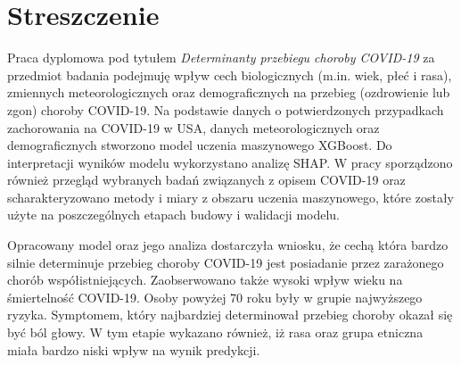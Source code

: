 \documentclass[polish, twoside, 12pt, a4paper]{article}
\theoremstyle{definition}
\theoremstyle{plain}
\theoremstyle{remark}
\begin{document}
\clearpage
{}
\listoftables

\clearpage
{}
\listoffigures



\clearpage
{}
\section*{Streszczenie}


Praca dyplomowa pod tytułem \emph{Determinanty przebiegu choroby COVID-19} za przedmiot badania podejmuję wpływ cech biologicznych (m.in. wiek, płeć i rasa), zmiennych meteorologicznych oraz demograficznych na przebieg (ozdrowienie lub zgon) choroby COVID-19. Na podstawie danych o potwierdzonych przypadkach zachorowania na COVID-19 w USA, danych meteorologicznych oraz demograficznych stworzono model uczenia maszynowego XGBoost. Do interpretacji wyników modelu wykorzystano analizę SHAP. W pracy sporządzono również przegląd wybranych badań związanych z opisem COVID-19 oraz scharakteryzowano metody i miary z obszaru uczenia maszynowego, które zostały użyte na poszczególnych etapach budowy i walidacji modelu.

Opracowany model oraz jego analiza dostarczyła wniosku, że cechą która bardzo silnie determinuje przebieg choroby COVID-19 jest posiadanie przez zarażonego chorób współistniejących. Zaobserwowano także wysoki wpływ wieku na śmiertelność COVID-19. Osoby powyżej 70 roku były w grupie najwyższego ryzyka. Symptomem, który najbardziej determinował przebieg choroby okazał się być ból głowy. W tym etapie wykazano również, iż rasa oraz grupa etniczna miała bardzo niski wpływ na wynik predykcji.
\end{document}
